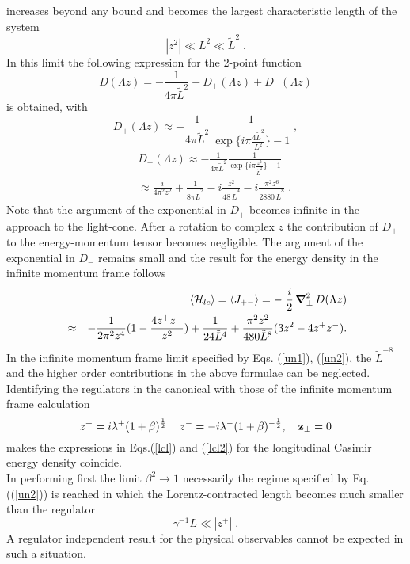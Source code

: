\documentclass[a4paper,twocolumn,eqsecnum,aps]{revtex4}
\begin{document}
increases beyond any bound and becomes the largest characteristic length of the system  
\begin{equation}
  \label{un2} |z^2| \ll  L^2 \ll \tilde{L}^2 \;.
\end{equation}
In this limit the following expression for the 2-point function 
\begin{equation}
  \label{DL2}
  D (\Lambda z) = -\frac{1}{4 \pi \tilde{L}^{2} }+ D _{+} (\Lambda z) + D_{-} (\Lambda z) 
\end{equation}
is obtained, with 
\begin{equation}
  \label{DL2+}
  D_{+} (\Lambda z) \approx -\frac{1}{4 \pi \tilde{L}^{2} } \,
\frac{1}{ \exp\{i\pi\frac{4 \tilde{L}^{2} }{L^{2}}\}-1} \;,
\end{equation}
\begin{eqnarray}
\label{exp}
 &&D_{-} (\Lambda z) \approx -\frac{1}{4 \pi \tilde{L}^2} \frac{1}{ \exp\{i \pi \frac{z^{2}}{\tilde{L}^2}\}-1 } \nonumber \\
&&\approx \frac{i}{4 \pi ^{2} z^{2}} +\frac{1}{8 \pi \tilde{L}^{2} }    -i \frac{ z^{2}}{48\, \tilde{L}^{4}}-i\frac{ \pi ^{2} z^{6}}{2880 \, \tilde{L}^{8}} \;. 
\end{eqnarray}
Note that the argument of the exponential in $  D_{+} $ becomes infinite in the approach to the light-cone. After a rotation to complex $z$  the  contribution of  $  D_{+} $ to the energy-momentum tensor becomes negligible. The argument of the exponential in $  D_{-} $ remains small and the result for the  energy density in the infinite momentum frame follows  
\begin{eqnarray}
  \label{lcl2}
&&\langle {\cal H}_{lc} \rangle = \langle J_{+-} \rangle = - \; \frac{i}{2} \,\mbox{\boldmath$\nabla$}^{2}_{\perp}\,D (\Lambda z) \nonumber \\
&\approx& -\frac{1}{2\pi^2 z^4}
(1-\frac{4z^{+}z^{-}}{z^2})+ \frac{1}{24 \tilde{L}^{4}}+\frac{\pi^{2}z^{2}}{480 \tilde{L}^{8}}(3z^{2}-4z^{+}z^{-}) . \nonumber\\
\end{eqnarray}
In the infinite momentum frame limit specified by Eqs. (\ref{un1}), (\ref{un2}), the $\tilde{L}^{-8}$  and the higher order contributions in the above formulae can be neglected. Identifying the regulators in the canonical with those of the infinite momentum frame calculation
$$ z^{+}= i\lambda^{+}(1+\beta)^{\frac{1}{2}}\,\quad z^{-} = -i\lambda^{-}(1+\beta)^{-\frac{1}{2}},\quad {\bf z}_{\perp}=0$$ 
makes the  expressions in Eqs.(\ref{lcl}) and (\ref{lcl2}) for the longitudinal Casimir energy density coincide.  \\
In performing first the limit $ \beta^2 \rightarrow 1$   necessarily  the regime specified by  Eq.((\ref{un2})) is reached in which the Lorentz-contracted length becomes much smaller than the regulator 
$$ \gamma^{-1} L \ll |z^{+}| \;.$$ 
A regulator independent result for the physical observables cannot be expected in such a situation.
\end{document}
